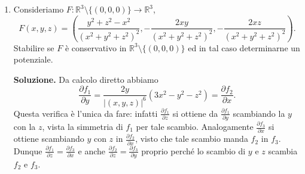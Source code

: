 \begin{enumerate}
	\textbf{Soluzione.}
		Se $\omega_{\alpha,\beta} = f_1 dx + f_2 dy + f_3 dz$ è esatta, allora deve essere chiusa, quindi
		\[
		\begin{cases}
			\frac{\partial f_1}{\partial y} = x - z = \frac{\partial f_2}{\partial x} = 2\alpha x - z \\
			\frac{\partial f_1}{\partial z} = -y = \frac{\partial f_3}{\partial x} = -y \\
			\frac{\partial f_2}{\partial z} = 2\beta z - x = \frac{\partial f_3}{\partial y} = z - x
		\end{cases}
		\]
		Quindi tali uguaglianze valgono per ogni $(x,y,z) \in \mathbb{R}^3$ se e solo se $\alpha = \beta = \frac{1}{2}$. Per determinarne il potenziale procediamo per integrazione curvilinea, considerando il segmento che congiunge l'origine con $(x,y,z) \in \mathbb{R}^3$, ovvero
		\[
		\gamma(t) = t(x,y,z) \quad \text{e} \quad t \in [0,1].
		\]
		Essendo $\mathbb{R}^3$ semplicemente connesso e $\omega_{1/2,1/2}$ chiusa, tale 1-forma differenziale è anche esatta su $\mathbb{R}^3$ e pertanto possiamo definire la primitiva per integrazione
		\[
		\begin{aligned}
			f(x,y,z) &= \int_{\gamma} \omega_{1/2,1/2} \\
			&= \int_0^1 \left(t^2 xy(x - z) + y t^2 \left(\frac{x^2}{2} + \frac{z^2}{2} - xz\right) + t^2 yz(z - x)\right) dt \\
			&= \frac{xy}{3}(x - z) + \frac{y}{3} \left(\frac{x^2}{2} + \frac{z^2}{2} - xz\right) + \frac{yz}{3}(z - x) \\
			&= \frac{x^2 y}{2} + \frac{z^2 y}{2} - x y z,
		\end{aligned}
		\]
		che è una primitiva di $\omega_{1/2,1/2}$. Infine abbiamo
		\[
		\int_{\gamma} \omega_{1/2,1/2} = f\left(\frac{\pi}{4}, 1, \frac{1}{\sqrt{2}}\right) = \frac{\pi^2}{32} + \frac{1}{4} - \frac{\pi}{4\sqrt{2}}.
		\]
	
	
	\item Consideriamo $F: \mathbb{R}^3 \setminus \{(0,0,0)\} \to \mathbb{R}^3$,
	\[
	F(x,y,z) = \left(\frac{y^2 + z^2 - x^2}{(x^2 + y^2 + z^2)^2}, -\frac{2xy}{(x^2 + y^2 + z^2)^2}, -\frac{2xz}{(x^2 + y^2 + z^2)^2}\right).
	\]
	Stabilire se $F$ è conservativo in $\mathbb{R}^3 \setminus \{(0,0,0)\}$ ed in tal caso determinarne un potenziale.
	
	\textbf{Soluzione.}
		Da calcolo diretto abbiamo
		\[
		\frac{\partial f_1}{\partial y} = \frac{2y}{|(x,y,z)|^6} (3x^2 - y^2 - z^2) = \frac{\partial f_2}{\partial x}.
		\]
		Questa verifica è l'unica da fare: infatti $\frac{\partial f_1}{\partial z}$ si ottiene da $\frac{\partial f_1}{\partial y}$ scambiando la $y$ con la $z$, vista la simmetria di $f_1$ per tale scambio. Analogamente $\frac{\partial f_3}{\partial x}$ si ottiene scambiando $y$ con $z$ in $\frac{\partial f_2}{\partial x}$, visto che tale scambio manda $f_2$ in $f_3$. Dunque $\frac{\partial f_1}{\partial z} = \frac{\partial f_3}{\partial x}$ e anche $\frac{\partial f_2}{\partial z} = \frac{\partial f_3}{\partial y}$ proprio perché lo scambio di $y$ e $z$ scambia $f_2$ e $f_3$.
		

\end{enumerate}
